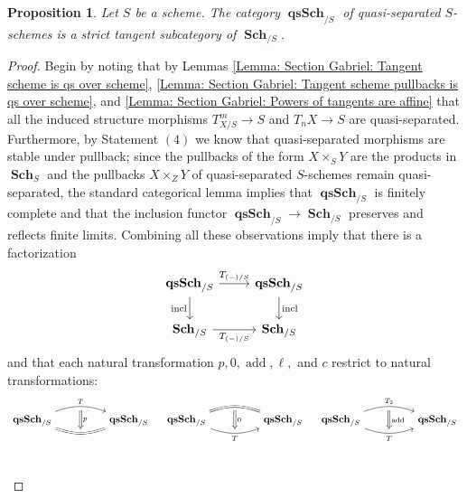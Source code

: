 \documentclass{amsart}
\newtheorem{proposition}[equation]{Proposition}
\theoremstyle{definition}
\DeclareMathOperator{\qsSch}{\mathbf{qsSch}}
\DeclareMathOperator{\Sch}{\mathbf{Sch}}
\numberwithin{equation}{subsection}
\begin{document}
\begin{proposition}\label{Prop: Section Gabriel: qsSch is tangent sbucat}
Let $S$ be a scheme. The category $\qsSch_{/S}$ of quasi-separated $S$-schemes is a strict tangent subcategory of $\Sch_{/S}$.
\end{proposition}
\begin{proof}
Begin by noting that by Lemmas \ref{Lemma: Section Gabriel: Tangent scheme is qs over scheme}, \ref{Lemma: Section Gabriel: Tangent scheme pullbacks is qs over scheme}, and \ref{Lemma: Section Gabriel: Powers of tangents are affine} that all the induced structure morphisms $T^m_{X/S} \to S$ and $T_nX \to S$ are quasi-separated. Furthermore, by Statement $(4)$ we know that quasi-separated morphisms are stable under pullback; since the pullbacks of the form $X \times_S Y$ are the products in $\Sch_S$ and the pullbacks $X \times_Z Y$ of quasi-separated $S$-schemes remain quasi-separated, the standard categorical lemma implies that $\qsSch_{/S}$ is finitely complete and that the inclusion functor $\qsSch_{/S} \to \Sch_{/S}$ preserves and reflects finite limits. Combining all these observations imply that there is a factorization
\[
\begin{tikzcd}
\qsSch_{/S} \ar[r]{}{T_{(-)/S}} \ar[d, swap]{}{\operatorname{incl}} & \qsSch_{/S} \ar[d]{}{\operatorname{incl}} \\
\Sch_{/S} \ar[r, swap]{}{T_{(-)/S}} & \Sch_{/S}
\end{tikzcd}
\]
and that each natural transformation $p, 0, \operatorname{add}, \ell,$ and $c$ restrict to natural transformations:
\[
\begin{tikzcd}
\qsSch_{/S} \ar[rr, bend left = 20, ""{name = U}]{}{T} \ar[rr, bend right = 20, swap, ""{name = D}, equals]{}{} & & \qsSch_{/S}
\ar[from = U, to = D, Rightarrow, shorten <= 4pt, shorten >= 4pt]{}{p}
\end{tikzcd}\quad
\begin{tikzcd}
	\qsSch_{/S} \ar[rr, bend left = 20, ""{name = U}, equals]{}{} \ar[rr, bend right = 20, swap, ""{name = D}]{}{T} & & \qsSch_{/S}
	\ar[from = U, to = D, Rightarrow, shorten <= 4pt, shorten >= 4pt]{}{0}
\end{tikzcd}\quad
\begin{tikzcd}
	\qsSch_{/S} \ar[rr, bend left = 20, ""{name = U}]{}{T_2} \ar[rr, bend right = 20, swap, ""{name = D}]{}{T} & & \qsSch_{/S}
	\ar[from = U, to = D, Rightarrow, shorten <= 4pt, shorten >= 4pt]{}{\operatorname{add}}
\end{tikzcd}
\]
\[
\begin{tikzcd}

\end{tikzcd}\]
\end{proof}
\end{document}
